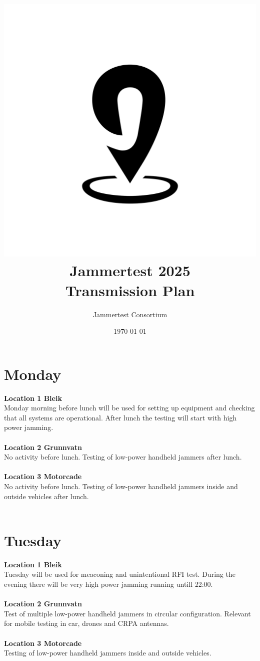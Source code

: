\documentclass[a4paper]{book}
\title{\includegraphics[scale=0.2]{graphics/jampin.png}\\ Jammertest 2025 \\ \huge{Transmission Plan}}
\author{Jammertest Consortium}
\date{\today \\ \DTMcurrenttime}
\begin{document}
\maketitle

\tableofcontents
\restoregeometry

\begin{landscape}

\chapter{Monday}
\Large \textbf{Location 1 Bleik} \\
Monday morning before lunch will be used for setting up equipment and checking that all systems are operational. After lunch the testing will start with high power jamming.\\ \\
\Large \textbf{Location 2 Grunnvatn} \\
No activity before lunch. Testing of low-power handheld jammers after lunch.\\ \\
\Large \textbf{Location 3 Motorcade} \\
No activity before lunch. Testing of low-power handheld jammers inside and outside vehicles after lunch.\\ \\

%

\chapter{Tuesday}
\Large \textbf{Location 1 Bleik} \\
Tuesday will be used for meaconing and unintentional RFI test. During the evening there will be very high power jamming running untill 22:00.\\ \\
\Large \textbf{Location 2 Grunnvatn} \\ 
Test of multiple low-power handheld jammers in circular configuration. Relevant for mobile testing in car, drones and CRPA antennas.\\ \\ 
\Large \textbf{Location 3 Motorcade} \\
Testing of low-power handheld jammers inside and outside vehicles.\\ \\

%


\end{landscape}
\end{document}
